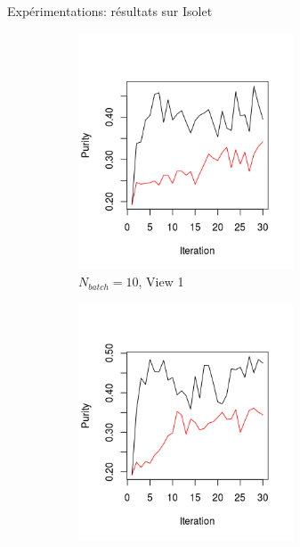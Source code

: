 \documentclass[hyperref={pdfpagelabels=false}]{beamer}
\begin{document}
        \begin{frame}{Expérimentations: résultats sur Isolet}
            \begin{figure}[!h]
                \centering
                \caption{Évolution des puretés pour Isolet. Chaque itération correspond à l'arrivée d'un nouveau batch.}
                \begin{subfigure}[b]{0.3\textwidth}
                    \centering
                    \includegraphics[width=0.7\textwidth, trim= 0cm 0.5cm 1cm 2cm, clip]{img/11.png}
                    \caption{$N_{batch}=10$, View 1}
                \end{subfigure}
                \begin{subfigure}[b]{0.3\textwidth}
                    \centering
                    \includegraphics[width=0.7\textwidth, trim= 0cm 0.5cm 1cm 1.73cm, clip]{img/22.png}

\end{subfigure}
\end{figure}
\end{frame}
\end{document}
